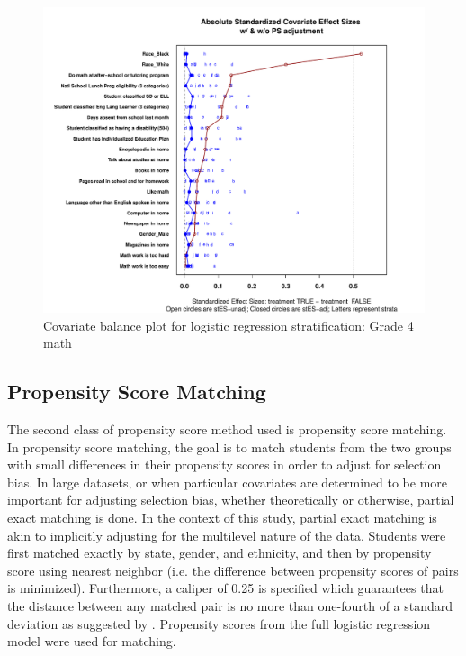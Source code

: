 \documentclass[letterpaper,12p,twoside]{article} %
\begin{document}


\begin{figure}[t]
\begin{center}
\includegraphics[width=\textwidth]{../Figures2009/g4math-lr-balance.pdf}
\caption{Covariate balance plot for logistic regression stratification: Grade 4 math}
\label{fig:g4math:balance}
\end{center}
\end{figure}


\clearpage




\subsection{Propensity Score Matching}

The second class of propensity score method used is propensity score matching. In propensity score matching, the goal is to match students from the two groups with small differences in their propensity scores in order to adjust for selection bias. In large datasets, or when particular covariates are determined to be more important for adjusting selection bias, whether theoretically or otherwise, partial exact matching is done. In the context of this study, partial exact matching is akin to implicitly adjusting for the multilevel nature of the data. Students were first matched exactly by state, gender, and ethnicity, and then by propensity score using nearest neighbor (i.e. the difference between propensity scores of pairs is minimized). Furthermore, a caliper of 0.25 is specified which guarantees that the distance between any matched pair is no more than one-fourth of a standard deviation as suggested by . Propensity scores from the full logistic regression model were used for matching.
\end{document}
